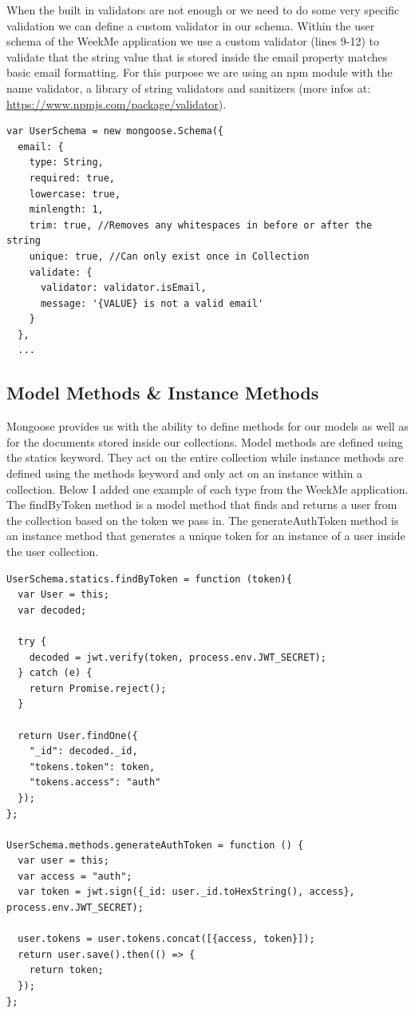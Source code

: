 \documentclass[11pt]{article}
\begin{document}
When the built in validators are not enough or we need to do some very specific validation we can define a custom validator in our schema. Within the user schema of the WeekMe application we use a custom validator (lines 9-12) to validate that the string value that is stored inside the email property matches basic email formatting. For this purpose we are using an npm module with the name validator, a library of string validators and sanitizers (more infos at: \url{https://www.npmjs.com/package/validator}).    


\begin{lstlisting}
var UserSchema = new mongoose.Schema({
  email: {
    type: String,
    required: true,
    lowercase: true,
    minlength: 1,
    trim: true, //Removes any whitespaces in before or after the string
    unique: true, //Can only exist once in Collection
    validate: {
      validator: validator.isEmail,
      message: '{VALUE} is not a valid email'
    }
  },
  ...
\end{lstlisting}
 




\subsection{Model Methods \& Instance Methods}
Mongoose provides us with the ability to define methods for our models as well as for the documents stored inside our collections. Model methods are defined using the statics keyword. They act on the entire collection while instance methods are defined using the methods keyword and only act on an instance within a collection. Below I added one example of each type from the WeekMe application. The findByToken method is a model method that finds and returns a user from the collection based on the token we pass in. The generateAuthToken method is an instance method that generates a unique token for an instance of a user inside the user collection. 

\begin{lstlisting}
UserSchema.statics.findByToken = function (token){
  var User = this;
  var decoded; 

  try {
    decoded = jwt.verify(token, process.env.JWT_SECRET);
  } catch (e) {
    return Promise.reject(); 
  }

  return User.findOne({
    "_id": decoded._id,
    "tokens.token": token,
    "tokens.access": "auth"
  });
};

UserSchema.methods.generateAuthToken = function () { 
  var user = this; 
  var access = "auth";
  var token = jwt.sign({_id: user._id.toHexString(), access}, process.env.JWT_SECRET);
  
  user.tokens = user.tokens.concat([{access, token}]);
  return user.save().then(() => {
    return token;
  });
};
\end{lstlisting}
\end{document}
